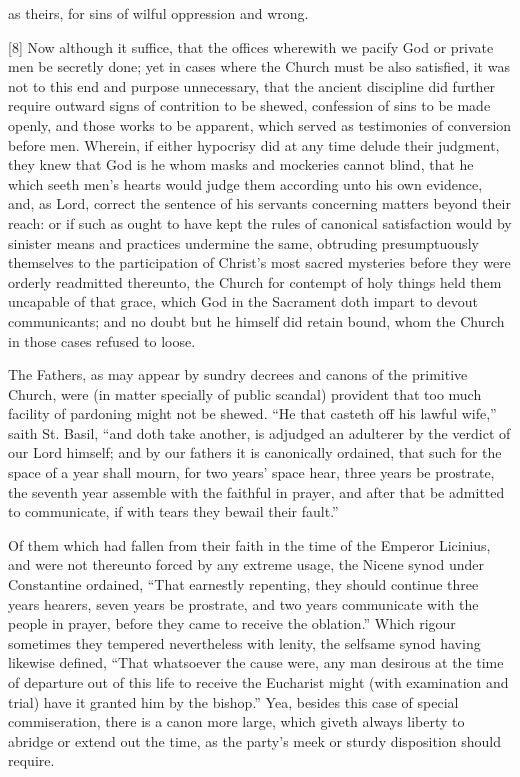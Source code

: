as theirs, for sins of wilful oppression and wrong.


[8] Now although it suffice, that the offices wherewith we pacify God or private men be secretly done; yet in cases where the Church must be also satisfied, it was not to this end and purpose unnecessary, that the ancient discipline did further require outward signs of contrition to be shewed, confession of sins to be made openly, and those works to be apparent, which served as testimonies of conversion before men. Wherein, if either hypocrisy did at any time delude their judgment, they knew that God is he whom masks and mockeries cannot blind, that he which seeth men’s hearts would judge them according unto his own evidence, and, as Lord, correct the sentence of his servants concerning matters beyond their reach: or if such as ought to have kept the rules of canonical satisfaction would by sinister means and practices undermine the same, obtruding presumptuously themselves to the participation of Christ’s most sacred mysteries before they were orderly readmitted thereunto, the Church for contempt of holy things held them uncapable of that grace, which God in the Sacrament doth impart to devout communicants; and no doubt but he himself did retain bound, whom the Church in those cases refused to loose.

The Fathers, as may appear by sundry decrees and canons of the primitive Church, were (in matter specially of public scandal) provident that too much facility of pardoning might not be shewed. “He that casteth off his lawful wife,” saith St. Basil, “and doth take another, is adjudged an adulterer by the verdict of our Lord himself; and by our fathers it is canonically ordained, that such for the space of a year shall mourn, for two years’ space hear, three years be prostrate,  the seventh year assemble with the faithful in prayer, and after that be admitted to communicate, if with tears they bewail their fault.”

Of them which had fallen from their faith in the time of the Emperor Licinius, and were not thereunto forced by any extreme usage, the Nicene synod under Constantine ordained, “That earnestly repenting, they should continue three years hearers, seven years be prostrate, and two years communicate with the people in prayer, before they came to receive the oblation.” Which rigour sometimes they tempered nevertheless with lenity, the selfsame synod having likewise defined, “That whatsoever the cause were, any man desirous at the time of departure out of this life to receive the Eucharist might (with examination and trial) have it granted him by the bishop.” Yea, besides this case of special commiseration, there is a canon more large, which giveth always liberty to abridge or extend out the time, as the party’s meek or sturdy disposition should require.

